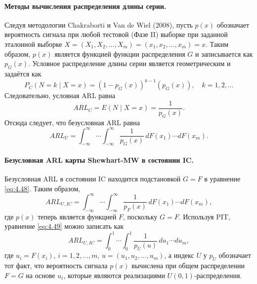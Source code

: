 \paragraph{Методы вычисления распределения длины серии.} Следуя методологии Chakraborti и Van de Wiel (2008), пусть \(p(x)\) обозначает вероятность сигнала при любой тестовой (Фазе II) выборке при заданной эталонной выборке \(X = (X_1, X_2, \ldots, X_m) = (x_1, x_2, \ldots, x_m) = x\). Таким образом, \(p(x)\) является функцией функции распределения \(G\) и записывается как \(p_G(x)\). Условное распределение длины серии является геометрическим и задаётся как
\begin{equation}
	P_C\left( N = k \mid X = x \right) = \left( 1 - p_G(x) \right)^{k-1}\left( p_G(x) \right), \quad k = 1, 2, \ldots
	\label{eq:4.46}
\end{equation}
Следовательно, условная ARL равна
\begin{equation}
	ARL_C = E\left( N \mid X = x \right) = \frac{1}{p_G(x)}.
	\label{eq:4.47}
\end{equation}
Отсюда следует, что безусловная ARL равна
\begin{equation}
	ARL_U = \int_{-\infty}^{\infty}\cdots\int_{-\infty}^{\infty} \frac{1}{p_G(x)}\, dF(x_1)\cdots dF(x_m).
	\label{eq:4.48}
\end{equation}

\paragraph{Безусловная ARL карты Shewhart-MW в состоянии IC.} Безусловная ARL в состоянии IC находится подстановкой \(G = F\) в уравнение \eqref{eq:4.48}. Таким образом,
\begin{equation}
	ARL_{U, IC} = \int_{-\infty}^{\infty}\cdots\int_{-\infty}^{\infty} \frac{1}{p_F(x)}\, dF(x_1)\cdots dF(x_m),
	\label{eq:4.49}
\end{equation}
где \(p(x)\) теперь является функцией \(F\), поскольку \(G = F\). Используя PIT, уравнение \eqref{eq:4.49} можно записать как
\begin{equation}
	ARL_{U, IC} = \int_{0}^{1}\cdots\int_{0}^{1} \frac{1}{p_U(u)}\, du_1\cdots du_m,
	\label{eq:4.50}
\end{equation}
где \(u_i = F(x_i)\), \(i = 1, 2, \ldots, m\), \(u = (u_1, u_2, \ldots, u_m)\), а индекс \(U\) у \(p_U\) обозначает тот факт, что вероятность сигнала \(p(x)\) вычислена при общем распределении \(F = G\) на основе \(u_i\), которые являются реализациями \(U(0, 1)\)-распределения.

